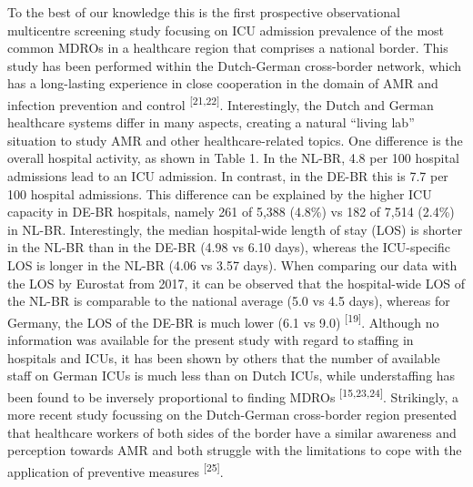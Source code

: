 \documentclass[
]{book}
\begin{document}
To the best of our knowledge this is the first prospective observational multicentre screening study focusing on ICU admission prevalence of the most common MDROs in a healthcare region that comprises a national border. This study has been performed within the Dutch-German cross-border network, which has a long-lasting experience in close cooperation in the domain of AMR and infection prevention and control \textsuperscript{{[}21,22{]}}. Interestingly, the Dutch and German healthcare systems differ in many aspects, creating a natural ``living lab'' situation to study AMR and other healthcare-related topics. One difference is the overall hospital activity, as shown in Table 1. In the NL-BR, 4.8 per 100 hospital admissions lead to an ICU admission. In contrast, in the DE-BR this is 7.7 per 100 hospital admissions. This difference can be explained by the higher ICU capacity in DE-BR hospitals, namely 261 of 5,388 (4.8\%) vs 182 of 7,514 (2.4\%) in NL-BR. Interestingly, the median hospital-wide length of stay (LOS) is shorter in the NL-BR than in the DE-BR (4.98 vs 6.10 days), whereas the ICU-specific LOS is longer in the NL-BR (4.06 vs 3.57 days). When comparing our data with the LOS by Eurostat from 2017, it can be observed that the hospital-wide LOS of the NL-BR is comparable to the national average (5.0 vs 4.5 days), whereas for Germany, the LOS of the DE-BR is much lower (6.1 vs 9.0) \textsuperscript{{[}19{]}}. Although no information was available for the present study with regard to staffing in hospitals and ICUs, it has been shown by others that the number of available staff on German ICUs is much less than on Dutch ICUs, while understaffing has been found to be inversely proportional to finding MDROs \textsuperscript{{[}15,23,24{]}}. Strikingly, a more recent study focussing on the Dutch-German cross-border region presented that healthcare workers of both sides of the border have a similar awareness and perception towards AMR and both struggle with the limitations to cope with the application of preventive measures \textsuperscript{{[}25{]}}.
\end{document}
